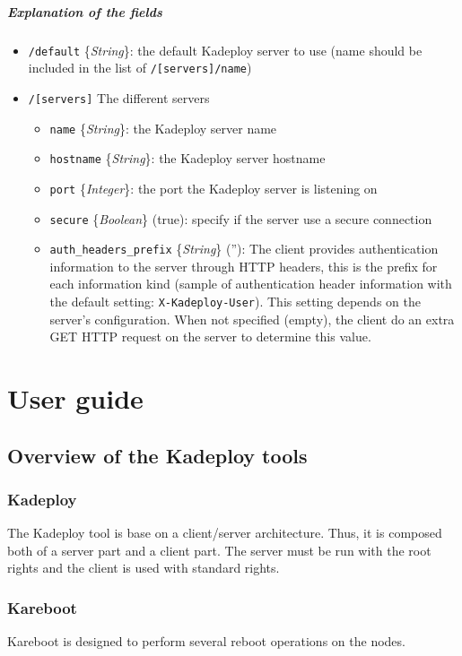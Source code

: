 \documentclass[a4wide,10pt,oneside]{book}
\newcommand{\ypath}[1]{\texttt{#1}}
\newcommand{\yfield}[2]{\texttt{#1} {\small\{{\emph{#2}}\}}:}
\newcommand{\yfieldd}[3]{\texttt{#1} {\small\{{\emph{#2}}\}} {\small(}#3{\small)}:}
\begin{document}
\paragraph{Explanation of the fields\\}
\begin{itemize}
  \item \yfield{\ypath{/default}}{String} the default Kadeploy server to use (name should be included in the list of \ypath{/[servers]/name})
  \item \ypath{/[servers]} The different servers
  \begin{itemize}
    \item \yfield{name}{String} the Kadeploy server name
    \item \yfield{hostname}{String} the Kadeploy server hostname
    \item \yfield{port}{Integer} the port the Kadeploy server is listening on
    \item \yfieldd{secure}{Boolean}{true} specify if the server use a secure connection
    \item \yfieldd{auth\_headers\_prefix}{String}{''} The client provides authentication information to the server through HTTP headers, this is the prefix for each information kind (sample of authentication header information with the default setting: \texttt{X-Kadeploy-User}). This setting depends on the server's configuration. When not specified (empty), the client do an extra GET HTTP request on the server to determine this value.
  \end{itemize}
\end{itemize}

\chapter{User guide}\label{chap:User_guide}

\section{Overview of the Kadeploy tools}
\subsection{Kadeploy}
The Kadeploy tool is base on a client/server architecture. Thus, it is composed both of a server part and a client part. The server must be run with the root rights and the client is used with standard rights.

\subsection{Kareboot}
Kareboot is designed to perform several reboot operations on the nodes.
\end{document}
